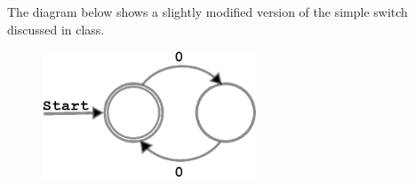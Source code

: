 \documentclass[]{exam}
\begin{document}
\begin{questions}
%
\question The diagram below shows a slightly modified version of the simple
switch discussed in class. \\
\begin{figure}[h]
\centering
\includegraphics[width=2.5in, height=.75in,keepaspectratio=true]{evenzeroautomata.eps}
\label{2sp}
\end{figure}


\end{questions}
\end{document}
